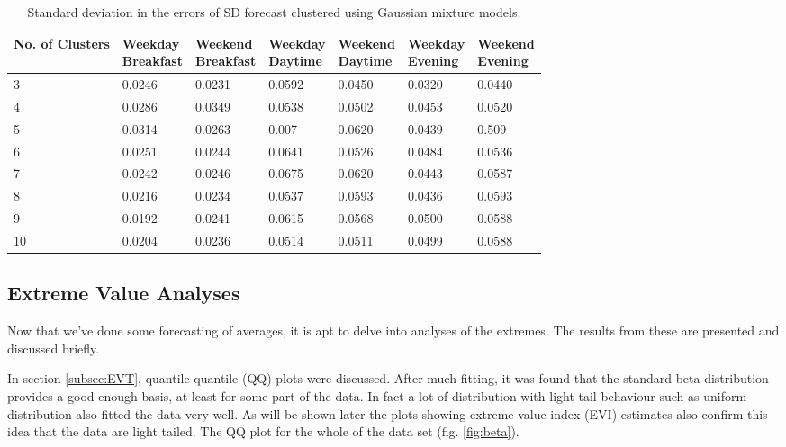 \documentclass[a4paper]{article}
\begin{document}
\begin{table}
\centering
\begin{tabular}{|l|l|l|l|l|l|l|}
\hline
\textbf{No. of Clusters} & \thead{\textbf{Weekday} \\ \textbf{Breakfast}} &\thead{\textbf{Weekend} \\ \textbf{ Breakfast}} &\thead{\textbf{Weekday} \\ \textbf{Daytime}} &\thead{\textbf{Weekend} \\ \textbf{Daytime}} &\thead{\textbf{Weekday} \\ \textbf{Evening}} &\thead{\textbf{Weekend} \\ \textbf{Evening}} \\
\hline
3 & 0.0246 & 0.0231 & 0.0592 & 0.0450 & 0.0320 & 0.0440 \\
\hline
4  & 0.0286 & 0.0349 & 0.0538 & 0.0502 & 0.0453 & 0.0520 \\
\hline
5 & 0.0314 & 0.0263 & 0.007 & 0.0620 & 0.0439 & 0.509 \\
\hline
6 & 0.0251 & 0.0244 & 0.0641 & 0.0526 & 0.0484 & 0.0536 \\
\hline
7 & 0.0242 & 0.0246 & 0.0675 & 0.0620 & 0.0443 & 0.0587 \\
\hline
8 & 0.0216 & 0.0234 & 0.0537 & 0.0593 & 0.0436 & 0.0593 \\
\hline
9 & 0.0192 & 0.0241 & 0.0615 & 0.0568 & 0.0500 & 0.0588 \\
\hline
10 & 0.0204 & 0.0236 & 0.0514 & 0.0511 & 0.0499 & 0.0588 \\
\hline
\end{tabular}
\caption{Standard deviation in the errors of SD forecast clustered using Gaussian mixture models.}
\label{tab:cluserrs_gm_sd}
\end{table}



\subsection{Extreme Value Analyses}
\label{subsec:EVres}
Now that we've done some forecasting of averages, it is apt to delve into analyses of the extremes. The results from these are presented and discussed briefly.

In section \ref{subsec:EVT}, quantile-quantile (QQ) plots were discussed. After much fitting, it was found that the standard beta distribution provides a good enough basis, at least for some part of the data. In fact a lot of distribution with light tail behaviour such as uniform distribution also fitted the data very well. As will be shown later the plots showing extreme value index (EVI) estimates also confirm this idea that the data are light tailed. The QQ plot for the whole of the data set (fig. \ref{fig:beta}).
\end{document}
